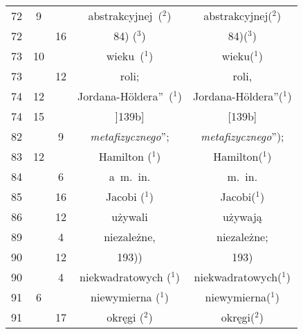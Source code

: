 \documentclass[a4paper,11pt]{article}
\begin{document}
\begin{center}
\begin{tabular}{|c|c|c|c|c|}
    72  &  9 & & abstrakcyjnej~($^{ 2 }$) & abstrakcyjnej($^{ 2 }$) \\
    72  & & 16 & 84) ($^{ 3 }$) & 84)($^{ 3 }$) \\
    73  & 10 & & wieku~($^{ 1 }$) & wieku($^{ 1 }$) \\
    73  & & 12 & roli; & roli, \\
    74  & 12 & & Jordana-H\"{o}ldera”~($^{ 1 }$)
           & Jordana-H\"{o}ldera”($^{ 1 }$) \\
    74  & 15 & & ]139b] & [139b] \\
    82  & &  9 & \textit{metafizycznego}”; & \textit{metafizycznego}”); \\
    83  & 12 & & Hamilton ($^{ 1 }$) & Hamilton($^{ 1 }$) \\
    84  & &  6 & a~m.~in. & m.~in. \\
    85  & & 16 & Jacobi ($^{ 1 }$) & Jacobi($^{ 1 }$) \\
    86  & & 12 & używali & używają \\
    89  & &  4 & niezależne, & niezależne; \\
    90  & & 12 & 193)) & 193) \\
    90  & &  4 & niekwadratowych ($^{ 1 }$) & niekwadratowych($^{ 1 }$) \\
    91  &  6 & & niewymierna ($^{ 1 }$) & niewymierna($^{ 1 }$) \\
    91  & & 17 & okręgi ($^{ 2 }$) & okręgi($^{ 2 }$) \\
    \hline
  \end{tabular}






\end{center}
\end{document}
